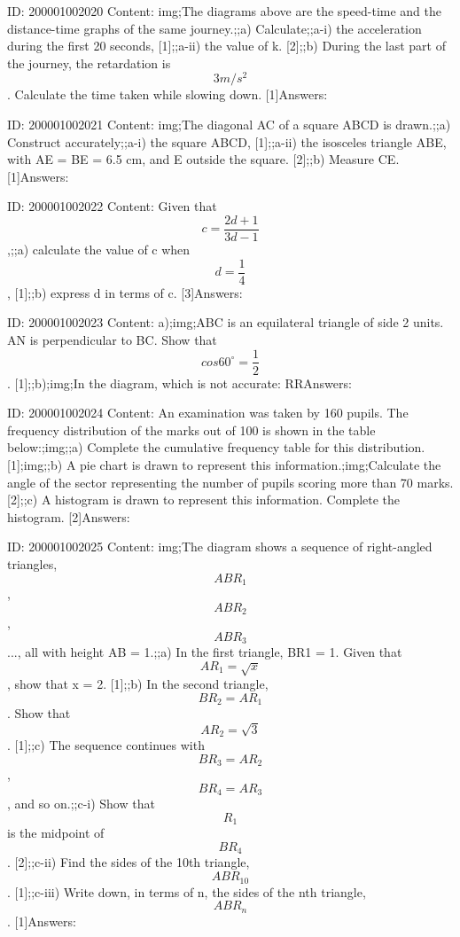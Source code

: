 \documentclass{article}
\begin{document}
ID: 200001002020
Content:
img;The diagrams above are the speed-time and the distance-time graphs of the same journey.;;a) Calculate;;a-i) the acceleration during the first 20 seconds, [1];;a-ii) the value of k. [2];;b) During the last part of the journey, the retardation is $$3m/s^{2} $$. Calculate the time taken while slowing down. [1]Answers:

ID: 200001002021
Content:
img;The diagonal AC of a square ABCD is drawn.;;a) Construct accurately;;a-i) the square ABCD, [1];;a-ii) the isosceles triangle ABE, with AE = BE = 6.5 cm, and E outside the square. [2];;b) Measure CE. [1]Answers:

ID: 200001002022
Content:
Given that $$c=\frac{2d+1}{3d-1}$$,;;a) calculate the value of c when $$d=\frac{1}{4}$$, [1];;b) express d in terms of c. [3]Answers:

ID: 200001002023
Content:
a);img;ABC is an equilateral triangle of side 2 units. AN is perpendicular to BC. Show that $$cos 60^{\circ}=\frac{1}{2}$$. [1];;b);img;In the diagram, which is not accurate: RRAnswers:

ID: 200001002024
Content:
An examination was taken by 160 pupils. The frequency distribution of the marks out of 100 is shown in the table below:;img;;a) Complete the cumulative frequency table for this distribution. [1];img;;b) A pie chart is drawn to represent this information.;img;Calculate the angle of the sector representing the number of pupils scoring more than 70 marks. [2];;c) A histogram is drawn to represent this information. Complete the histogram. [2]Answers:

ID: 200001002025
Content:
img;The diagram shows a sequence of right-angled triangles, $$ABR_1$$, $$ABR_2$$, $$ABR_3$$ ..., all with height AB = 1.;;a) In the first triangle, BR1 = 1. Given that $$AR_1=\sqrt{x}$$, show that x = 2. [1];;b) In the second triangle, $$BR_2=AR_1$$. Show that $$AR_2=\sqrt{3}$$. [1];;c) The sequence continues with $$BR_3=AR_2$$, $$BR_4=AR_3$$, and so on.;;c-i) Show that $$R_1$$ is the midpoint of $$BR_4$$. [2];;c-ii) Find the sides of the 10th triangle, $$ABR_{10}$$. [1];;c-iii) Write down, in terms of n, the sides of the nth triangle, $$ABR_{n}$$. [1]Answers:
\end{document}
